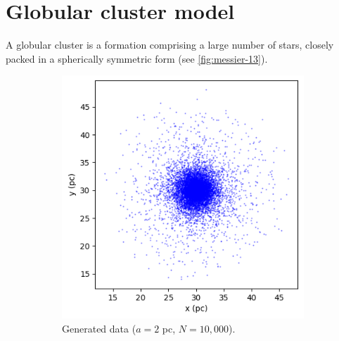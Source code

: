 \section{Globular cluster model}\label{sec:globular-cluster-model}
A globular cluster is a formation comprising a large number of stars, closely packed in a spherically symmetric form \cite{britannica2024globular} (see \autoref{fig:messier-13}).
\begin{figure}[!ht]
    \centering
    \begin{subfigure}[t]{0.4\textwidth}
        \vskip 0pt
        \centering
        \includegraphics[width=\textwidth]{chapters/test-models/img/globular_generated.png}
        \caption{Generated data ($a=2$ pc, $N=10,000$).}
        \label{fig:glob-cluster-model-generated}
    \end{subfigure}
    \hfill
    \begin{subfigure}[t]{0.4\textwidth}
        \vskip 0pt
        \centering

\end{subfigure}
\end{figure}
